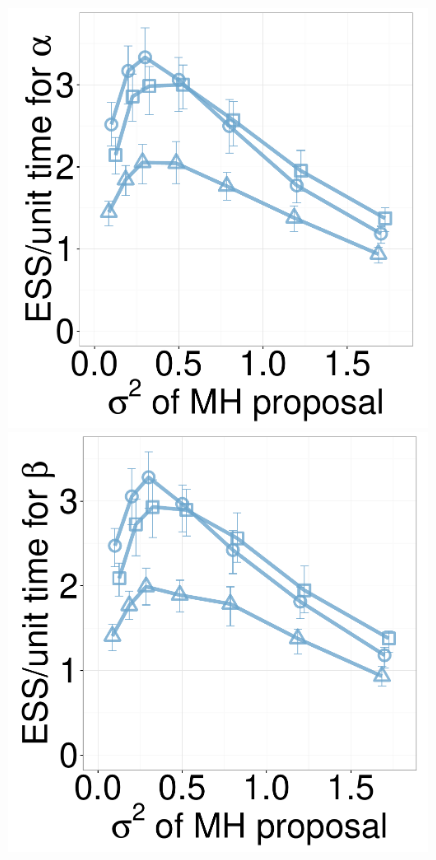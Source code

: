  \begin{figure}[H]
  \centering
  \begin{minipage}[!hp]{0.24\linewidth}
  \centering
    \includegraphics [width=0.99\textwidth, angle=0]{figs/new_whole_exp_figs/mh_cq_alpha_dim3.pdf}
\end{minipage}
  \begin{minipage}[hp]{0.24\linewidth}
  \centering
    \includegraphics [width=0.99\textwidth, angle=0]{figs/new_whole_exp_figs/mh_cq_beta_dim3.pdf}

\end{minipage}
\end{figure}
